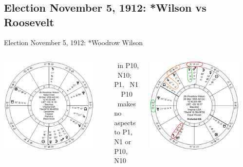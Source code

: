 \subsection{Election November 5, 1912: *Wilson vs Roosevelt}
\begin{frame}[t]{Election November 5, 1912: *Woodrow Wilson}
\small
\begin{columns}[T, onlytextwidth]
\vspace{-1em}
{\includegraphics[width=0.9\textwidth]{charts/Wilson.png}}
\fontsize{7pt}{8pt}\selectfont

\Venus\, in P10, \Opposition\, N10; \Square\, P1, \Trine\, N1 \\
\Saturn\, \Trine\, P10 \\
\Jupiter\, makes no aspects to P1, N1 or P10, N10

\vspace{-1em}
{\includegraphics[width=0.9\textwidth]{charts/Wilson-Prof-8th.png}}


\end{columns}
\end{frame}
